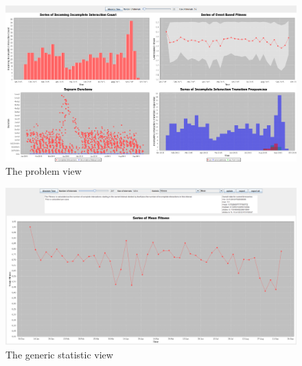  \begin{figure}
    \centering
    \includegraphics[width=\textwidth]{figures/implementation/problems_view}
    \caption{The problem view}
    \label{fig:probview}
\end{figure}
\begin{figure}
    \centering
    \includegraphics[width=\textwidth]{figures/implementation/genericstatistic_view}
    \caption{The generic statistic view}
    \label{fig:statview}
\end{figure}
